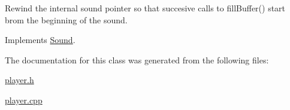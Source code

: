 Rewind the internal sound pointer so that succesive calls to fill\+Buffer() start brom the beginning of the sound. 

Implements \hyperlink{class_sound_a1870e3d50f0f58fc98fd966372ce42f1}{Sound}.



The documentation for this class was generated from the following files\+:\begin{DoxyCompactItemize}
\item 
\hyperlink{player_8h}{player.\+h}\item 
\hyperlink{player_8cpp}{player.\+cpp}\end{DoxyCompactItemize}
